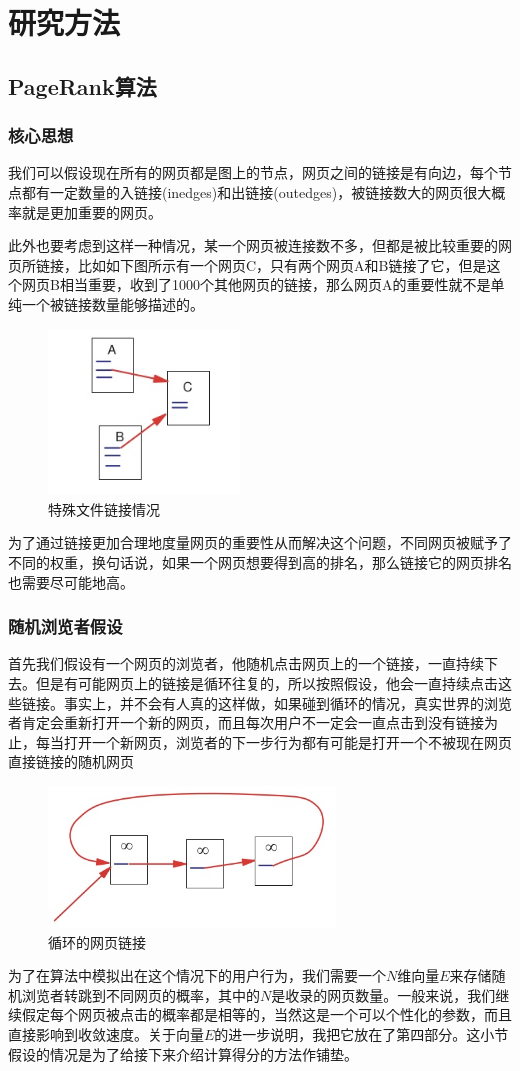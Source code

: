 \documentclass[a4paper, 14pt, twocolumn]{article}
\theoremstyle{definition}
\begin{document}
\section{研究方法}
\subsection{PageRank算法}
\subsubsection{核心思想}
我们可以假设现在所有的网页都是图上的节点，网页之间的链接是有向边，每个节点都有一定数量的入链接(inedges)和出链接(outedges)，被链接数大的网页很大概率就是更加重要的网页。\cite{CitationRanking}

此外也要考虑到这样一种情况，某一个网页被连接数不多，但都是被比较重要的网页所链接，比如如下图所示有一个网页C，只有两个网页A和B链接了它，但是这个网页B相当重要，收到了1000个其他网页的链接，那么网页A的重要性就不是单纯一个被链接数量能够描述的。
\begin{figure}[H]
\centering
\includegraphics[width=2in]{figure/filelink.jpg}
\caption{特殊文件链接情况}
\end{figure}
为了通过链接更加合理地度量网页的重要性从而解决这个问题，不同网页被赋予了不同的权重，换句话说，如果一个网页想要得到高的排名，那么链接它的网页排名也需要尽可能地高。

\subsubsection{随机浏览者假设}
首先我们假设有一个网页的浏览者，他随机点击网页上的一个链接，一直持续下去。但是有可能网页上的链接是循环往复的，所以按照假设，他会一直持续点击这些链接。事实上，并不会有人真的这样做，如果碰到循环的情况，真实世界的浏览者肯定会重新打开一个新的网页，而且每次用户不一定会一直点击到没有链接为止，每当打开一个新网页，浏览者的下一步行为都有可能是打开一个不被现在网页直接链接的随机网页\cite{Surfer}
\begin{figure}[H]
\centering
\includegraphics[width=3in]{figure/PageLoop.jpg}
\caption{循环的网页链接}
\end{figure}
为了在算法中模拟出在这个情况下的用户行为，我们需要一个$N$维向量$E$来存储随机浏览者转跳到不同网页的概率，其中的$N$是收录的网页数量。一般来说，我们继续假定每个网页被点击的概率都是相等的，当然这是一个可以个性化的参数，而且直接影响到收敛速度。关于向量$E$的进一步说明，我把它放在了第四部分。这小节假设的情况是为了给接下来介绍计算得分的方法作铺垫。
\end{document}

